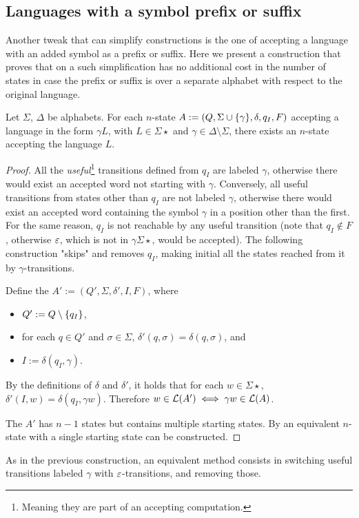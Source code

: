 \subsection{Languages with a symbol prefix or suffix}
Another tweak that can simplify constructions is the one of accepting a language with an added symbol as a prefix or suffix.
Here we present a construction that proves that on a \ONFA such simplification has no additional cost in the number of states in case the prefix or suffix is over a separate alphabet with respect to the original language.
\begin{thrm}
	Let $\Sigma$, $\Delta$ be alphabets.
	For each $n$-state \ONFA $A:=(Q,\Sigma\cup\{\gamma\},\delta,q_I,F)$ accepting a language in the form $\gamma L$, with $L\in\Sigma\star$ and $\gamma\in\Delta\setminus\Sigma$, there exists an $n$-state \ONFA accepting the language $L$.
\end{thrm}
\begin{proof}
	All the \emph{useful}\footnote{Meaning they are part of an accepting computation.} transitions defined from $q_I$ are labeled $\gamma$, otherwise there would exist an accepted word not starting with $\gamma$.
	Conversely, all useful transitions from states other than $q_I$ are not labeled $\gamma$, otherwise there would exist an accepted word containing the symbol $\gamma$ in a position other than the first.
	For the same reason, $q_I$ is not reachable by any useful transition (note that $q_I\notin F$, otherwise $\varepsilon$, which is not in $\gamma\Sigma\star$, would be accepted).
	The following construction "skips" and removes $q_I$, making initial all the states reached from it by $\gamma$-transitions.

	Define the \ONFA $A':=(Q',\Sigma,\delta',I,F)$, where
	\begin{itemize}
		\item $Q':=Q\setminus\{q_I\}$,
		\item for each $q\in Q'$ and $\sigma\in\Sigma$, $\delta'(q,\sigma)=\delta(q,\sigma)$, and
		\item $I:=\delta(q_I,\gamma)$.
	\end{itemize}

	By the definitions of $\delta$ and $\delta'$, it holds that for each $w\in\Sigma\star$, $\delta'(I,w)=\delta(q_I,\gamma w)$.
	Therefore $w\in\mathcal L(A')\iff \gamma w\in\mathcal L(A)$.

	The \ONFA $A'$ has $n-1$ states but contains multiple starting states. By  an equivalent $n$-state \ONFA with a single starting state can be constructed.
\end{proof}
As in the previous construction, an equivalent method consists in switching useful transitions labeled $\gamma$ with $\varepsilon$-transitions, and removing those.

